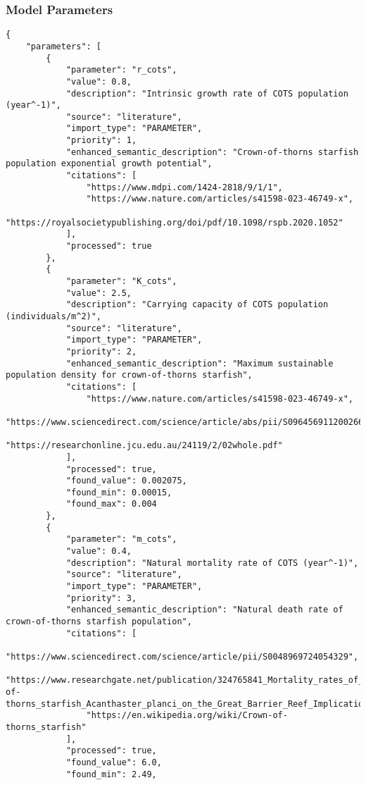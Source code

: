 \subsubsection{Model Parameters}
\begin{lstlisting}
{
    "parameters": [
        {
            "parameter": "r_cots",
            "value": 0.8,
            "description": "Intrinsic growth rate of COTS population (year^-1)",
            "source": "literature",
            "import_type": "PARAMETER",
            "priority": 1,
            "enhanced_semantic_description": "Crown-of-thorns starfish population exponential growth potential",
            "citations": [
                "https://www.mdpi.com/1424-2818/9/1/1",
                "https://www.nature.com/articles/s41598-023-46749-x",
                "https://royalsocietypublishing.org/doi/pdf/10.1098/rspb.2020.1052"
            ],
            "processed": true
        },
        {
            "parameter": "K_cots",
            "value": 2.5,
            "description": "Carrying capacity of COTS population (individuals/m^2)",
            "source": "literature",
            "import_type": "PARAMETER",
            "priority": 2,
            "enhanced_semantic_description": "Maximum sustainable population density for crown-of-thorns starfish",
            "citations": [
                "https://www.nature.com/articles/s41598-023-46749-x",
                "https://www.sciencedirect.com/science/article/abs/pii/S0964569112002669",
                "https://researchonline.jcu.edu.au/24119/2/02whole.pdf"
            ],
            "processed": true,
            "found_value": 0.002075,
            "found_min": 0.00015,
            "found_max": 0.004
        },
        {
            "parameter": "m_cots",
            "value": 0.4,
            "description": "Natural mortality rate of COTS (year^-1)",
            "source": "literature",
            "import_type": "PARAMETER",
            "priority": 3,
            "enhanced_semantic_description": "Natural death rate of crown-of-thorns starfish population",
            "citations": [
                "https://www.sciencedirect.com/science/article/pii/S0048969724054329",
                "https://www.researchgate.net/publication/324765841_Mortality_rates_of_small_juvenile_crown-of-thorns_starfish_Acanthaster_planci_on_the_Great_Barrier_Reef_Implications_for_population_size_and_larval_settlement_thresholds_for_outbreaks",
                "https://en.wikipedia.org/wiki/Crown-of-thorns_starfish"
            ],
            "processed": true,
            "found_value": 6.0,
            "found_min": 2.49,

\end{lstlisting}
